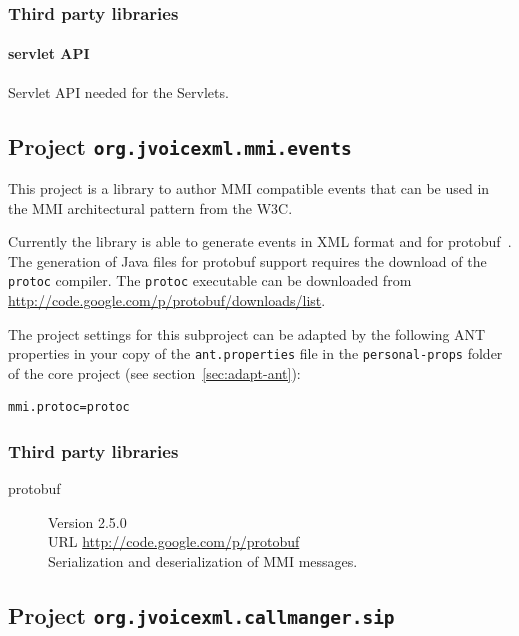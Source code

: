 \documentclass[11pt,a4paper]{article}
\begin{document}
\subsubsection{Third party libraries}

\paragraph{servlet API}

Servlet API needed for the Servlets.

\subsection{Project \texttt{org.jvoicexml.mmi.events}}
\label{sec:mmi-events}

This project is a library to author MMI compatible events that can be used in
the MMI architectural pattern from the W3C.

Currently the library is able to generate events in XML format and for
protobuf~\cite{google:protobuf}. The generation of Java files for protobuf
support requires the download of the \texttt{protoc} compiler. The \texttt{protoc}
executable can be downloaded from \url{http://code.google.com/p/protobuf/downloads/list}.

The project settings for this subproject can be adapted by the following ANT
properties in your copy of the \texttt{ant.properties} file in the
\texttt{personal-props} folder of the core project (see 
section~\ref{sec:adapt-ant}):
\begin{lstlisting}
mmi.protoc=protoc
\end{lstlisting}

\subsubsection{Third party libraries}

\begin{description}
\item[protobuf] Version 2.5.0 \\
URL \url{http://code.google.com/p/protobuf} \\
Serialization and deserialization of MMI messages.
\end{description}

\subsection{Project \texttt{org.jvoicexml.callmanger.sip}}
\end{document}
